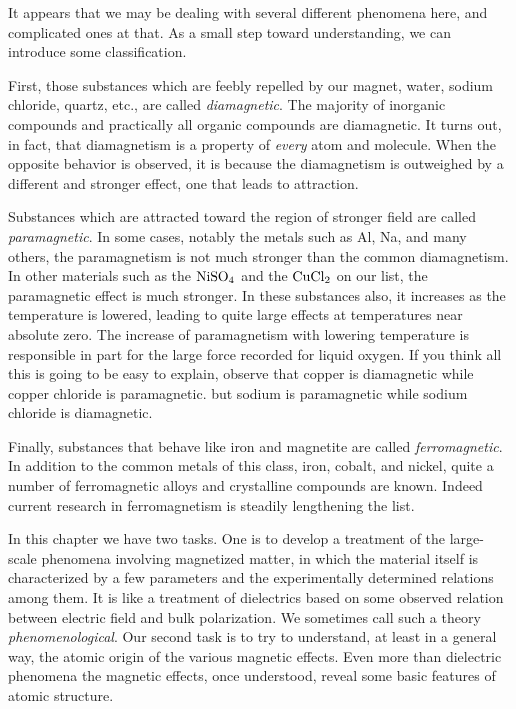 
It appears that we may be dealing with several different phenomena
here, and complicated ones at that. As a small step toward
understanding, we can introduce some classification.

First, those substances which are feebly repelled by our magnet,
water, sodium chloride, quartz, etc., are called \emph{diamagnetic}. The
majority of inorganic compounds and practically all organic compounds
are diamagnetic. It turns out, in fact, that diamagnetism
is a property of \emph{every} atom and molecule. When the opposite behavior
is observed, it is because the diamagnetism is outweighed by
a different and stronger effect, one that leads to attraction.

Substances which are attracted toward the region of stronger field
are called \emph{paramagnetic}.
In some cases, notably the metals such as
Al, Na, and many others, the paramagnetism is not much stronger
than the common diamagnetism. In other materials such as the
$\textup{NiSO}_4$ and the $\textup{CuCl}_2$ on our list, the paramagnetic effect is much
stronger. In these substances also, it increases as the temperature
is lowered, leading to quite large effects at temperatures near absolute
zero. The increase of paramagnetism with lowering temperature
is responsible in part for the large force recorded for liquid
oxygen. If you think all this is going to be easy to explain, observe
that copper is diamagnetic while copper chloride is paramagnetic.
but sodium is paramagnetic while sodium chloride is diamagnetic.

Finally, substances that behave like iron and magnetite are called
\emph{ferromagnetic}.
In addition to the common metals of this class, iron,
cobalt, and nickel, quite a number of ferromagnetic alloys and
crystalline compounds are known. Indeed current research in 
ferromagnetism is steadily lengthening the list.

In this chapter we have two tasks. One is to develop a treatment
of the large-scale phenomena involving magnetized matter, in which
the material itself is characterized by a few parameters and the
experimentally determined relations among them. It is like a treatment
of dielectrics based on some observed relation between electric
field and bulk polarization. We sometimes call such a theory 
\emph{phenomenological}. Our second task is to try to understand, at least in
a general way, the atomic origin of the various magnetic effects.
Even more than dielectric phenomena the magnetic effects, once
understood, reveal some basic features of atomic structure.

